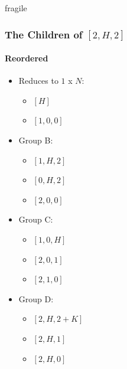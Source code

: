\documentclass[aspectratio=169,usenames,dvipsnames]{beamer}
\begin{document}
\begin{frame}{fragile}
    \frametitle{The Children of $[2, H, 2]$}
    \framesubtitle{Reordered}
    
    \begin{multicols}{2}
    \begin{itemize}
        \item Reduces to $1$ x $N$:
        \begin{itemize}
            \item $[H]$
            \item $[1, 0, 0]$
        \end{itemize}
    \end{itemize}
    \text{$  $} %
    
    \begin{itemize}
        \item Group B:
        \begin{itemize}
            \item $[1, H, 2]$
            \item $[0, H, 2]$
            \item $[2, 0, 0]$
        \end{itemize}
    \end{itemize}
    
    \begin{itemize}
        \item Group C:
        \begin{itemize}
            \item $[1, 0, H]$
            \item $[2, 0, 1]$
            \item $[2, 1, 0]$
        \end{itemize}
    \end{itemize}
    
    \begin{itemize}
        \item Group D:
        \begin{itemize}
            \item $[2, H, 2 + K]$
            \item $[2, H, 1]$
            \item $[2, H, 0]$
        \end{itemize}
    \end{itemize}
    \end{multicols}
    
\end{frame}
\end{document}
